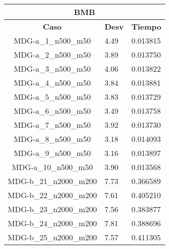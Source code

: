 \documentclass[10pt,a4paper]{article}
\begin{document}
\begin{table}[]
	\centering
	\begin{tabular}{|c|l|l|}
		\hline
		\multicolumn{3}{|c|}{\textbf{BMB}}                                                                 \\ \hline
		\textbf{Caso}          & \multicolumn{1}{c|}{\textbf{Desv}} & \multicolumn{1}{c|}{\textbf{Tiempo}} \\ \hline
		MDG-a\_1\_n500\_m50    & 4.49                               & 0.013815                             \\ \hline
		MDG-a\_2\_n500\_m50    & 3.89                               & 0.013750                             \\ \hline
		MDG-a\_3\_n500\_m50    & 4.06                               & 0.013822                             \\ \hline
		MDG-a\_4\_n500\_m50    & 3.84                               & 0.013881                             \\ \hline
		MDG-a\_5\_n500\_m50    & 3.83                               & 0.013729                             \\ \hline
		MDG-a\_6\_n500\_m50    & 3.49                               & 0.013758                             \\ \hline
		MDG-a\_7\_n500\_m50    & 3.92                               & 0.013730                             \\ \hline
		MDG-a\_8\_n500\_m50    & 3.18                               & 0.014093                             \\ \hline
		MDG-a\_9\_n500\_m50    & 3.16                               & 0.013897                             \\ \hline
		MDG-a\_10\_n500\_m50   & 3.90                               & 0.013568                             \\ \hline
		MDG-b\_21\_n2000\_m200 & 7.73                               & 0.366589                             \\ \hline
		MDG-b\_22\_n2000\_m200 & 7.61                               & 0.405210                             \\ \hline
		MDG-b\_23\_n2000\_m200 & 7.56                               & 0.383877                             \\ \hline
		MDG-b\_24\_n2000\_m200 & 7.81                               & 0.388696                             \\ \hline
		MDG-b\_25\_n2000\_m200 & 7.57                               & 0.411305                             \\ \hline

\end{tabular}
\end{table}
\end{document}
